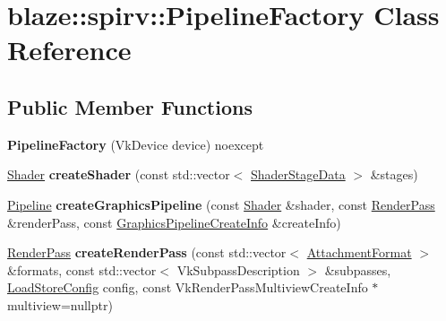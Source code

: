 \hypertarget{classblaze_1_1spirv_1_1PipelineFactory}{}\section{blaze\+:\+:spirv\+:\+:Pipeline\+Factory Class Reference}
\label{classblaze_1_1spirv_1_1PipelineFactory}
\subsection*{Public Member Functions}
\begin{DoxyCompactItemize}
\item 
\mbox{\label{classblaze_1_1spirv_1_1PipelineFactory_acdb4e699d0cb4898a4fa51e0b7e14e70}} 
{\bfseries Pipeline\+Factory} (Vk\+Device device) noexcept
\item 
\mbox{\label{classblaze_1_1spirv_1_1PipelineFactory_ac1b6b95ed9659c501ecb4ac626a2e1bb}} 
\hyperlink{structblaze_1_1spirv_1_1Shader}{Shader} {\bfseries create\+Shader} (const std\+::vector$<$ \hyperlink{structblaze_1_1spirv_1_1ShaderStageData}{Shader\+Stage\+Data} $>$ \&stages)
\item 
\mbox{\label{classblaze_1_1spirv_1_1PipelineFactory_a46ebc6903dfacabb5c27146762979f14}} 
\hyperlink{structblaze_1_1spirv_1_1Pipeline}{Pipeline} {\bfseries create\+Graphics\+Pipeline} (const \hyperlink{structblaze_1_1spirv_1_1Shader}{Shader} \&shader, const \hyperlink{structblaze_1_1spirv_1_1RenderPass}{Render\+Pass} \&render\+Pass, const \hyperlink{structblaze_1_1spirv_1_1GraphicsPipelineCreateInfo}{Graphics\+Pipeline\+Create\+Info} \&create\+Info)
\item 
\mbox{\label{classblaze_1_1spirv_1_1PipelineFactory_ab4db0891a3c6ae0419cdf2df2fc0fd60}} 
\hyperlink{structblaze_1_1spirv_1_1RenderPass}{Render\+Pass} {\bfseries create\+Render\+Pass} (const std\+::vector$<$ \hyperlink{structblaze_1_1spirv_1_1AttachmentFormat}{Attachment\+Format} $>$ \&formats, const std\+::vector$<$ Vk\+Subpass\+Description $>$ \&subpasses, \hyperlink{structblaze_1_1spirv_1_1LoadStoreConfig}{Load\+Store\+Config} config, const Vk\+Render\+Pass\+Multiview\+Create\+Info $\ast$multiview=nullptr)

\end{DoxyCompactItemize}
